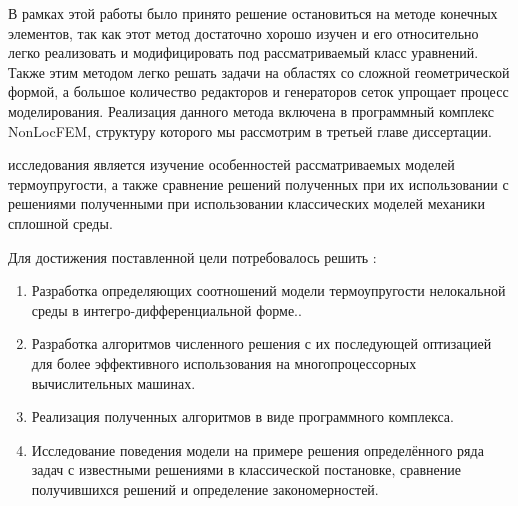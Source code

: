 В рамках этой работы было принято решение остановиться на методе конечных элементов, так как этот метод достаточно хорошо изучен и его относительно легко реализовать и модифицировать под рассматриваемый класс уравнений. Также этим методом легко решать задачи на областях со сложной геометрической формой, а большое количество редакторов и генераторов сеток упрощает процесс моделирования. Реализация данного метода включена в программный комплекс NonLocFEM, структуру которого мы рассмотрим в третьей главе диссертации.



{\aim}
исследования является изучение особенностей рассматриваемых моделей термоупругости, а также сравнение решений полученных при их использовании с решениями полученными при использовании классических моделей механики сплошной среды.

Для достижения поставленной цели потребовалось решить {\tasks}:
\begin{enumerate}[beginpenalty=10000] %
  \item Разработка определяющих соотношений модели термоупругости нелокальной среды в интегро-дифференциальной форме..
  \item Разработка алгоритмов численного решения с их последующей оптизацией для более эффективного использования на многопроцессорных вычислительных машинах.
  \item Реализация полученных алгоритмов в виде программного комплекса.
  \item Исследование поведения модели на примере решения определённого ряда задач с известными решениями в классической постановке, сравнение получившихся решений и определение закономерностей.
\end{enumerate}


